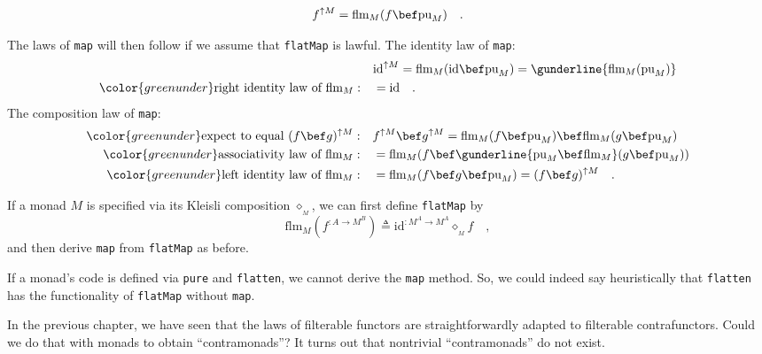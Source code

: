 ~\vspace{-0.1\baselineskip}
\[
f^{\uparrow M}=\text{flm}_{M}(f\bef\text{pu}_{M})\quad.
\]

The laws of \lstinline!map! will then follow if we assume that \lstinline!flatMap!
is lawful. The identity law of \lstinline!map!:
\begin{align*}
 & \text{id}^{\uparrow M}=\text{flm}_{M}(\text{id}\bef\text{pu}_{M})=\gunderline{\text{flm}_{M}(\text{pu}_{M})}\\
{\color{greenunder}\text{right identity law of }\text{flm}_{M}:}\quad & =\text{id}\quad.
\end{align*}
The composition law of \lstinline!map!:
\begin{align*}
{\color{greenunder}\text{expect to equal }(f\bef g)^{\uparrow M}:}\quad & f^{\uparrow M}\bef g^{\uparrow M}=\text{flm}_{M}(f\bef\text{pu}_{M})\bef\text{flm}_{M}(g\bef\text{pu}_{M})\\
{\color{greenunder}\text{associativity law of }\text{flm}_{M}:}\quad & =\text{flm}_{M}(f\bef\gunderline{\text{pu}_{M}\bef\text{flm}_{M}}(g\bef\text{pu}_{M}))\\
{\color{greenunder}\text{left identity law of }\text{flm}_{M}:}\quad & =\text{flm}_{M}(f\bef g\bef\text{pu}_{M})=(f\bef g)^{\uparrow M}\quad.
\end{align*}

If a monad $M$ is specified via its Kleisli composition $\diamond_{_{M}}$,
we can first define \lstinline!flatMap! by
\[
\text{flm}_{M}(f^{:A\rightarrow M^{B}})\triangleq\text{id}^{:M^{A}\rightarrow M^{A}}\diamond_{_{M}}f\quad,
\]
and then derive \lstinline!map! from \lstinline!flatMap! as before.

If a monad\textsf{'}s code is defined via \lstinline!pure! and \lstinline!flatten!,
we cannot derive the \lstinline!map! method. So, we could indeed
say heuristically that \lstinline!flatten! has the functionality
of \lstinline!flatMap! without \lstinline!map!.

In the previous chapter, we have seen that the laws of filterable
functors are straightforwardly adapted to filterable contrafunctors.
Could we do that with monads to obtain \textsf{``}contramonads\textsf{''}? It turns
out that nontrivial \textsf{``}contramonads\textsf{''} do not
exist. 

